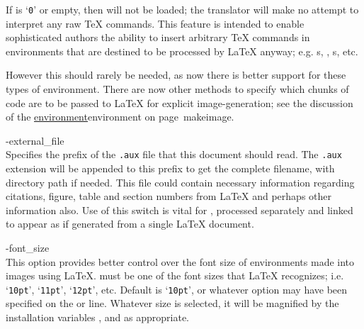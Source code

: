 \begin{htmllist}
\begin{changebar}
If  is `\texttt{0}' or empty, then  will not be loaded;
the translator will make no attempt to interpret any raw \TeX{} commands.
This feature is intended to enable sophisticated authors the ability to insert
arbitrary \TeX{} commands in environments that are destined
to be processed by \LaTeX{} anyway;
e.g. s, , s, etc.
\begin{changebar}%
However this should rarely be needed, as now there is better support for these
types of environment. There are now other methods to specify which chunks of code
are to be passed to \LaTeX{} for explicit image-generation;
see the discussion of the 
\hyperref[page]{environment}{environment on page~}{}{makeimage}.
\end{changebar}


%

\item [ -external\_file \Meta{filename}\label{cs_externalfile}]
\\
Specifies the prefix of the \texttt{.aux} file that this document should read.
The \texttt{.aux} extension will be appended to this prefix
to get the complete filename, with directory path if needed.\html{\\}
This file could contain necessary information
regarding citations, figure, table and section numbers from \LaTeX{}
and perhaps other information also.
Use of this switch is vital for ,
processed separately and linked to appear as if generated
from a single \LaTeX{} document.%

%
%

\item [ -font\_size \Meta{size}\label{cs_fontsize}]
\\
This option provides better control
over the font size of environments made into images using \LaTeX.
 must be one of the font sizes that \LaTeX{} recognizes;
i.e. `\texttt{10pt}', `\texttt{11pt}', `\texttt{12pt}', etc.
Default is `\texttt{10pt}', or whatever option may have been specified on the
 or  line.\html{\\}
Whatever size is selected, it will be magnified by the installation variables
, 
and  as appropriate.


\end{changebar}
\end{htmllist}
